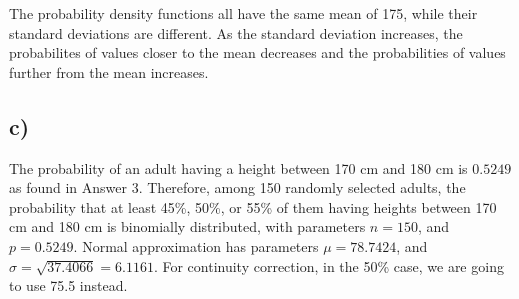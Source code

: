 \documentclass[12pt]{article}
\begin{document}
The probability density functions all have the same mean of 175, while their
standard deviations are different. As the standard deviation increases, the
probabilites of values closer to the mean decreases and the probabilities of
values further from the mean increases.

\newpage

\subsection*{c)}

The probability of an adult having a height between 170 cm and 180 cm is
$0.5249$ as found in Answer 3. Therefore, among 150 randomly selected adults,
the probability that at least 45\%, 50\%, or 55\% of them having heights between
170 cm and 180 cm is binomially distributed, with parameters $n = 150$, and $p =
0.5249$. Normal approximation has parameters $\mu = 78.7424$, and $\sigma =
\sqrt{37.4066} = 6.1161$. For continuity correction, in the 50\% case, we are
going to use 75.5 instead.
\end{document}
